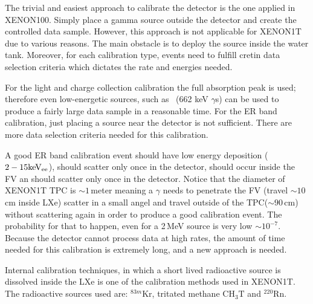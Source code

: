The trivial and easiest approach to calibrate the detector is the one applied in XENON100. Simply place a gamma source outside the detector and create the controlled data sample. However, this approach is not applicable for XENON1T due to various reasons. The main obstacle is to deploy the source inside the water tank. Moreover, for each calibration type, events need to fulfill cretin data selection criteria which dictates the rate and energies needed. 

For the light and charge collection calibration the full absorption peak is used; therefore even low-energetic sources, such as \Cs\ (662 keV $\gamma$s) can be used to produce a fairly large data sample in a reasonable time. For the ER band calibration, just placing a source near the detector is not sufficient. There are more  data selection criteria needed for this calibration. 

A good ER band calibration event should have low energy deposition ($2-15\mathrm{keV_\mathrm{ee}}$), should scatter only once in the detector, should occur inside the FV an should scatter only once in the detector. Notice that the diameter of XENON1T TPC is $\sim 1$\,meter meaning a $\gamma$ needs to penetrate the FV (travel $\sim 10$\,cm inside LXe) scatter in a small angel and travel outside of the TPC($\sim 90$\,cm) without scattering again in order to produce a good calibration event. The probability for that to happen, even for a 2\,MeV source is very low $\sim 10^{-7}$. Because the detector cannot process data at high rates, the amount of time needed for this calibration is extremely long, and a new approach is needed.

Internal calibration techniques, in which a short lived radioactive source is dissolved inside the LXe is one of the calibration methods used in XENON1T. The radioactive sources used are: $^{83m}\mathrm{Kr}$, tritated methane $\mathrm{CH_3T}$ and $^{220}\mathrm{Rn}$.    





